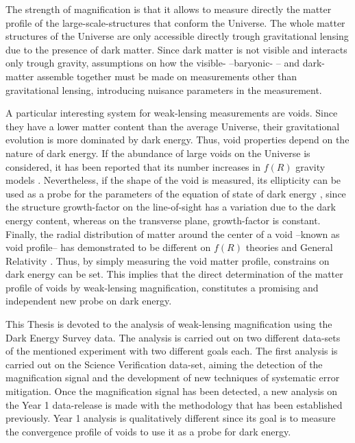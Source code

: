 The strength of magnification is that it allows to measure directly the matter profile of the large-scale-structures that conform the Universe. The whole matter structures of the Universe are only accessible directly trough gravitational lensing due to the presence of dark matter. Since dark matter is not visible and interacts only trough gravity, assumptions on how the visible- --baryonic- -- and dark- matter assemble together must be made on measurements other than gravitational lensing, introducing nuisance parameters in the measurement.
\newline

A particular interesting system for weak-lensing measurements are voids. Since they have a lower matter content than the average Universe, their gravitational evolution is more dominated by dark energy. Thus, void properties depend on the nature of dark energy. If the abundance of large voids on the Universe is considered, it has been reported that its number increases in $f(R)$ gravity models \cite{2012MNRAS.421.3481L,2017JCAP...03..012V}. Nevertheless, if the shape of the void is measured, its ellipticity can be used as a probe for the parameters of the equation of state of dark energy \cite{2010MNRAS.403.1392L,0004-637X-754-2-109,PhysRevLett.98.081301,2013PhRvL.111x1103S}, since the structure growth-factor on the line-of-sight has a variation due to
the dark energy content, whereas on the transverse plane, growth-factor is constant. Finally, the radial distribution of matter around the center of a void --known as void profile-- has demonstrated to be different on $f(R)$ theories and General Relativity \cite{2014APh....54...44A,2014arXiv1410.8355C,2015MNRAS.451.4215Z,2015JCAP...08..028B,2016PhRvD..93j3522A,2016PhRvD..94j3524A}. Thus, by simply measuring the void matter profile, constrains on dark energy can be set. This implies that the direct determination of the matter profile of voids by weak-lensing magnification, constitutes a promising and independent new probe on dark energy.
\newline

This Thesis is devoted to the analysis of weak-lensing magnification using the Dark Energy Survey data. The analysis is carried out on two different data-sets of the mentioned experiment with two different goals each. The first analysis is carried out on the Science Verification data-set, aiming the detection of the magnification signal and the development of new techniques of systematic error mitigation. Once the magnification signal has been detected, a new analysis on the Year 1 data-release is made with the methodology that has been established previously. Year 1 analysis is qualitatively different since its goal is to measure the convergence profile of voids to use it as a probe for dark energy.
\newline

